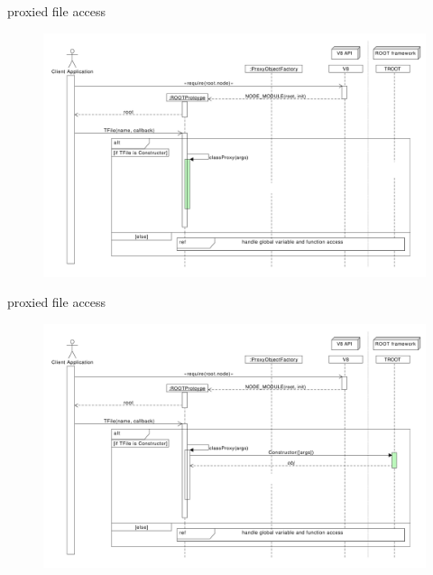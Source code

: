\begin{frame}{proxied file access}
  \begin{figure}[htb]
    \centering
      \includegraphics[width=\textwidth, height=.85\textheight, keepaspectratio]{./resources/proxycall/fileOpen_h3.pdf}
  \end{figure}
\end{frame}

\begin{frame}{proxied file access}
  \begin{figure}[htb]
    \centering
      \includegraphics[width=\textwidth, height=.85\textheight, keepaspectratio]{./resources/proxycall/fileOpen_h4.pdf}
  \end{figure}
\end{frame}

